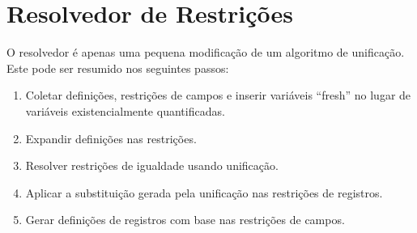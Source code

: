 \documentclass[a4paper,8pt]{article}
\begin{document}
     \section{Resolvedor de Restrições}\label{constraintsolver}

     O resolvedor é apenas uma pequena modificação de um algoritmo de
     unificação. Este pode ser resumido nos seguintes passos:
     \begin{enumerate}
          \item Coletar definições, restrições de campos e inserir
            variáveis ``fresh'' no lugar de variáveis existencialmente
            quantificadas.
          \item Expandir definições nas restrições.
          \item Resolver restrições de igualdade usando unificação.
          \item Aplicar a substituição gerada pela unificação nas
            restrições de registros.
          \item Gerar definições de registros com base nas restrições
            de campos.
     \end{enumerate}









\end{document}
